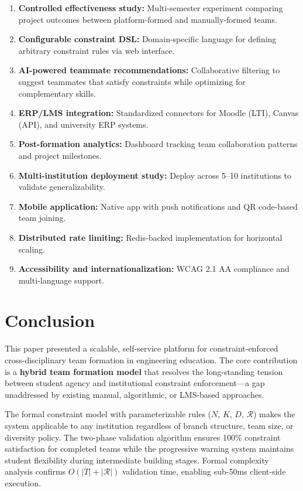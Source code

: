 \documentclass[12pt,a4paper]{article}
\begin{document}
\begin{enumerate}[noitemsep,topsep=3pt]
    \item \textbf{Controlled effectiveness study:} Multi-semester experiment comparing project outcomes between platform-formed and manually-formed teams.
    \item \textbf{Configurable constraint DSL:} Domain-specific language for defining arbitrary constraint rules via web interface.
    \item \textbf{AI-powered teammate recommendations:} Collaborative filtering to suggest teammates that satisfy constraints while optimizing for complementary skills.
    \item \textbf{ERP/LMS integration:} Standardized connectors for Moodle (LTI), Canvas (API), and university ERP systems.
    \item \textbf{Post-formation analytics:} Dashboard tracking team collaboration patterns and project milestones.
    \item \textbf{Multi-institution deployment study:} Deploy across 5--10 institutions to validate generalizability.
    \item \textbf{Mobile application:} Native app with push notifications and QR code-based team joining.
    \item \textbf{Distributed rate limiting:} Redis-backed implementation for horizontal scaling.
    \item \textbf{Accessibility and internationalization:} WCAG 2.1 AA compliance and multi-language support.
\end{enumerate}

\section{Conclusion}

This paper presented a scalable, self-service platform for constraint-enforced cross-disciplinary team formation in engineering education. The core contribution is a \textbf{hybrid team formation model} that resolves the long-standing tension between student agency and institutional constraint enforcement---a gap unaddressed by existing manual, algorithmic, or LMS-based approaches.

The formal constraint model with parameterizable rules ($N$, $K$, $D$, $\mathcal{R}$) makes the system applicable to any institution regardless of branch structure, team size, or diversity policy. The two-phase validation algorithm ensures 100\% constraint satisfaction for completed teams while the progressive warning system maintains student flexibility during intermediate building stages. Formal complexity analysis confirms $O(|T| + |\mathcal{R}|)$ validation time, enabling sub-50ms client-side execution.
\end{document}
